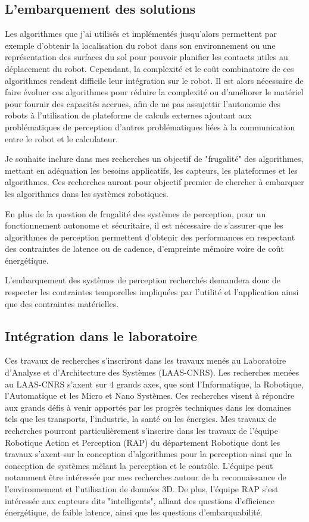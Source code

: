 \subsection{L'embarquement des solutions}

Les algorithmes que j'ai utilisés et implémentés jusqu'alors permettent par exemple d'obtenir la localisation du robot dans son environnement ou une représentation des surfaces du sol pour pouvoir planifier les contacts utiles au déplacement du robot. Cependant, la complexité et le coût combinatoire de ces algorithmes rendent difficile leur intégration sur le robot. Il est alors nécessaire de faire évoluer ces algorithmes pour réduire la complexité ou d'améliorer le matériel pour fournir des capacités accrues, afin de ne pas assujettir l'autonomie des robots à l'utilisation de plateforme de calculs externes ajoutant aux problématiques de perception d'autres problématiques liées à la communication entre le robot et le calculateur.

Je souhaite inclure dans mes recherches un objectif de "frugalité" des algorithmes, mettant en adéquation les besoins applicatifs, les capteurs, les plateformes et les algorithmes. Ces recherches auront pour objectif premier de chercher à embarquer les algorithmes dans les systèmes robotiques.

En plus de la question de frugalité des systèmes de perception, pour un fonctionnement autonome et sécuritaire, il est nécessaire de s'assurer que les algorithmes de perception permettent d'obtenir des performances en respectant des contraintes de latence ou de cadence, d'empreinte mémoire voire de coût énergétique.

L'embarquement des systèmes de perception recherchés demandera donc de respecter les contraintes temporelles impliquées par l'utilité et l'application ainsi que des contraintes matérielles.

\subsection{Intégration dans le laboratoire}

Ces travaux de recherches s'inscriront dans les travaux menés au Laboratoire d'Analyse et d'Architecture des Systèmes (LAAS-CNRS). Les recherches menées au LAAS-CNRS s'axent sur 4 grands axes, que sont l'Informatique, la Robotique, l'Automatique et les Micro et Nano Systèmes. Ces recherches visent à répondre aux grands défis à venir apportés par les progrès techniques dans les domaines tels que les transports, l'industrie, la santé ou les énergies. Mes travaux de recherches pourront particulièrement s'inscrire dans les travaux de l'équipe Robotique Action et Perception (RAP) du département Robotique dont les travaux s'axent sur la conception d'algorithmes pour la perception ainsi que la conception de systèmes mêlant la perception et le contrôle. L'équipe peut notamment être intéressée par mes recherches autour de la reconnaissance de l'environnement et l'utilisation de données 3D. De plus, l'équipe RAP s'est intéressée aux capteurs dits "intelligents", alliant des questions d'efficience énergétique, de faible latence, ainsi que les questions d'embarquabilité.

